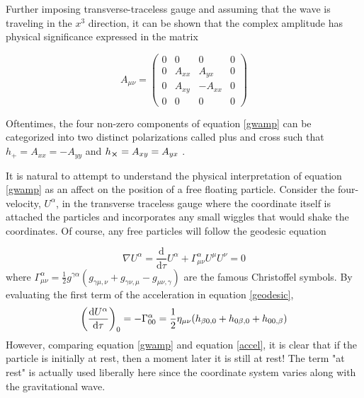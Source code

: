 	Further imposing transverse-traceless gauge and assuming that the wave is traveling in the $x^3$ direction, it can be shown that the complex amplitude has physical significance expressed in the matrix
	
	\begin{equation} \label{gwamp}
	A_{\mu \nu} = 
	\begin{pmatrix}
			0 &    0   &  0      & 0 
		 \\ 0 & A_{xx} &  A_{yx} & 0
		 \\ 0 & A_{xy} & -A_{xx} & 0
		 \\ 0 &    0   &  0      & 0
	\end{pmatrix}
	\end{equation}

	Oftentimes, the four non-zero components of equation \ref{gwamp} can be categorized into two distinct polarizations called plus and cross such that $h_{+} = A_{xx} = -A_{yy}$ and $h_{\cross} = A_{xy} = A_{yx}$ .

 
	It is natural to attempt to understand the physical interpretation of equation \ref{gwamp} as an affect on the position of a free floating particle. Consider the four-velocity, $U^{\alpha}$, in the transverse traceless gauge where the coordinate itself is attached the particles and incorporates any small wiggles that would shake the coordinates.  Of course, any free particles will follow the geodesic equation
	
	\begin{equation}\label{geodesic}
	\nabla U^{\alpha} = \frac{\text{d}}{\text{d} \tau} U^{\alpha} + \Gamma^{\alpha}_{\mu \nu} U^{\mu} U^{\nu} = 0
	\end{equation}	
	where $\Gamma^{\alpha}_{\mu \nu} = \frac{1}{2} g^{\gamma \alpha}(g_{\gamma \mu, \nu} + g_{\gamma \nu,\mu} - g_{\mu \nu, \gamma} )$ are the famous Christoffel symbols.
	By evaluating the first term of the acceleration in equation \ref{geodesic},
	\begin{equation}\label{accel}
	\bigg(\frac{\text{d}U^{\alpha}}{\text{d}\tau}\bigg)_0 = -\Gamma^{\alpha}_{00} 
	\\ = \frac{1}{2} \eta_{\mu \nu} (h_{\beta 0, 0} + h_{0 \beta, 0} + h_{0 0, \beta} )
	\end{equation}
	However, comparing equation \ref{gwamp} and equation \ref{accel}, it is clear that if the particle is initially at rest, then a moment later it is still at rest! The term "at rest" is actually used liberally here since the coordinate system varies along with the gravitational wave. 
	
